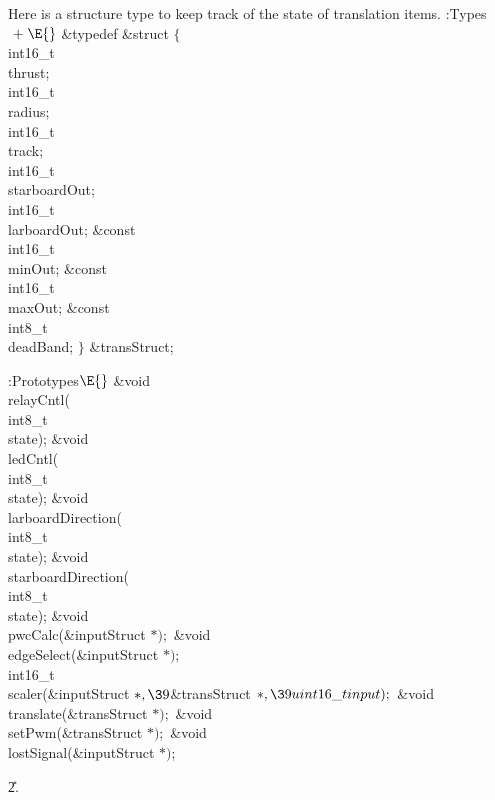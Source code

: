 Here is a structure type to keep track of the state of translation items.
\Y\B\4:Types\X${}\mathrel+\E{}$\6
\&{typedef} \&{struct} ${}\{{}$\1\6
\\{int16\_t}\\{thrust};\6
\\{int16\_t}\\{radius};\6
\\{int16\_t}\\{track};\6
\\{int16\_t}\\{starboardOut};\6
\\{int16\_t}\\{larboardOut};\7
\&{const} \\{int16\_t}\\{minOut};\6
\&{const} \\{int16\_t}\\{maxOut};\6
\&{const} \\{int8\_t}\\{deadBand};\2\6
${}\}{}$ \&{transStruct};\par
\fi

\B{}:Prototypes\X${}\E{}$\6
\&{void} \\{relayCntl}(\\{int8\_t}\\{state});\6
\&{void} \\{ledCntl}(\\{int8\_t}\\{state});\6
\&{void} \\{larboardDirection}(\\{int8\_t}\\{state});\6
\&{void} \\{starboardDirection}(\\{int8\_t}\\{state});\6
\&{void} \\{pwcCalc}(\&{inputStruct} ${}{*});{}$\6
\&{void} \\{edgeSelect}(\&{inputStruct} ${}{*});{}$\7
\\{int16\_t}\\{scaler}(\&{inputStruct} ${}{*},\39{}$\&{transStruct} ${}{*},\39%
\\{uint16\_t}\\{input});{}$\7
\&{void} \\{translate}(\&{transStruct} ${}{*});{}$\6
\&{void} \\{setPwm}(\&{transStruct} ${}{*});{}$\6
\&{void} \\{lostSignal}(\&{inputStruct} ${}{*}){}$;\par
\U2.\fi


